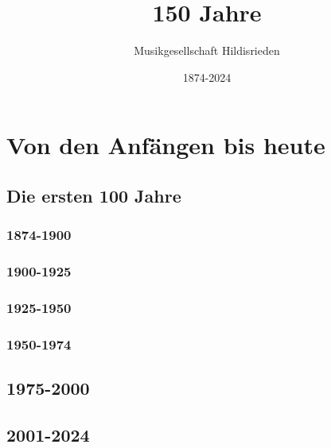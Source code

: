 \documentclass[]{book}
\title{150 Jahre}
\author{Musikgesellschaft Hildisrieden}
\date{1874-2024}
\begin{document}
\frontmatter
\maketitle



\renewcommand{\baselinestretch}{0.8}\normalsize
\tableofcontents
\renewcommand{\baselinestretch}{1.0}\normalsize

\mainmatter


\part{Von den Anfängen bis heute}

\chapter{Die ersten 100 Jahre}


\section*{1874-1900}




\section*{1900-1925}

\clearpage

\section*{1925-1950}

\clearpage

\section*{1950-1974}



\chapter{1975-2000}


\chapter{2001-2024}

\end{document}

